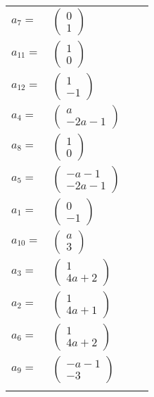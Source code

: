 \documentclass[1p]{elsarticle_modified}
\theoremstyle{definition}
\begin{document}
\begin{tabular}{m{7pt} m{180pt} m{7pt} m{180pt} }
\flushright $a_{7}=$&$\begin{pmatrix}0\\1\end{pmatrix}$ \\
\flushright $a_{11}=$&$\begin{pmatrix}1\\0\end{pmatrix}$ \\
\flushright $a_{12}=$&$\begin{pmatrix}1\\-1\end{pmatrix}$ \\
\flushright $a_{4}=$&$\begin{pmatrix}a\\-2 a-1\end{pmatrix}$ \\
\flushright $a_{8}=$&$\begin{pmatrix}1\\0\end{pmatrix}$ \\
\flushright $a_{5}=$&$\begin{pmatrix}- a-1\\-2 a-1\end{pmatrix}$ \\
\flushright $a_{1}=$&$\begin{pmatrix}0\\-1\end{pmatrix}$ \\
\flushright $a_{10}=$&$\begin{pmatrix}a\\3\end{pmatrix}$ \\
\flushright $a_{3}=$&$\begin{pmatrix}1\\4 a+2\end{pmatrix}$ \\
\flushright $a_{2}=$&$\begin{pmatrix}1\\4 a+1\end{pmatrix}$ \\
\flushright $a_{6}=$&$\begin{pmatrix}1\\4 a+2\end{pmatrix}$ \\
\flushright $a_{9}=$&$\begin{pmatrix}- a-1\\-3\end{pmatrix}$\\&\end{tabular}
\end{document}
